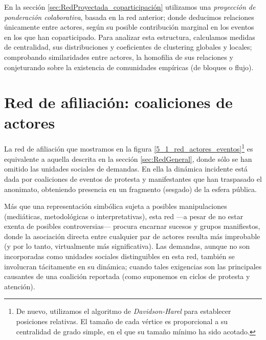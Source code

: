 \documentclass[letterpaper, 11pt]{book}
\theoremstyle{definition}
\theoremstyle{remark}
\begin{document}
En la sección \ref{sec:RedProyectada_coparticipación} utilizamos una \emph{proyección de ponderación colaborativa}, basada en la red anterior; donde deducimos relaciones únicamente entre actores, según su posible contribución marginal en los eventos en los que han coparticipado. 
Para analizar esta estructura, calculamos medidas de centralidad, sus distribuciones y coeficientes de clustering globales y locales; comprobando similaridades entre actores, la homofilia de sus relaciones y conjeturando sobre la existencia de comunidades empíricas (de bloques o flujo). 






\section{Red de afiliación: coaliciones de actores}
\label{sec:Red bipartita_actoresEps}

La red de afiliación que mostramos en la figura \ref{5_1_red_actores_eventos}\footnote{
    De nuevo, utilizamos el algoritmo de \emph{Davidson-Harel} para establecer posiciones relativas. 
    El tamaño de cada vértice es proporcional a su centralidad de grado simple, en el que su tamaño mínimo ha sido acotado. 
} 
es equivalente a aquella descrita en la sección \ref{sec:RedGeneral}, donde sólo se han omitido las unidades sociales de demandas. 
En ella la dinámica incidente está dada por coaliciones de eventos de protesta y manifestantes que han traspasado el anonimato, obteniendo presencia en un fragmento (sesgado) de la esfera pública. 


Más que una representación simbólica sujeta a posibles manipulaciones (mediáticas, metodológicas o interpretativas), esta red ---a pesar de no estar exenta de posibles controversias--- procura encarnar sucesos y grupos manifiestos, donde la asociación directa entre cualquier par de actores resulta más improbable (y por lo tanto, virtualmente más significativa). 
Las demandas, aunque no son incorporadas como unidades sociales distinguibles en esta red, también se involucran tácitamente en su dinámica; cuando tales exigencias son las principales causantes de una coalición reportada (como suponemos en ciclos de protesta y atención). 
\end{document}
